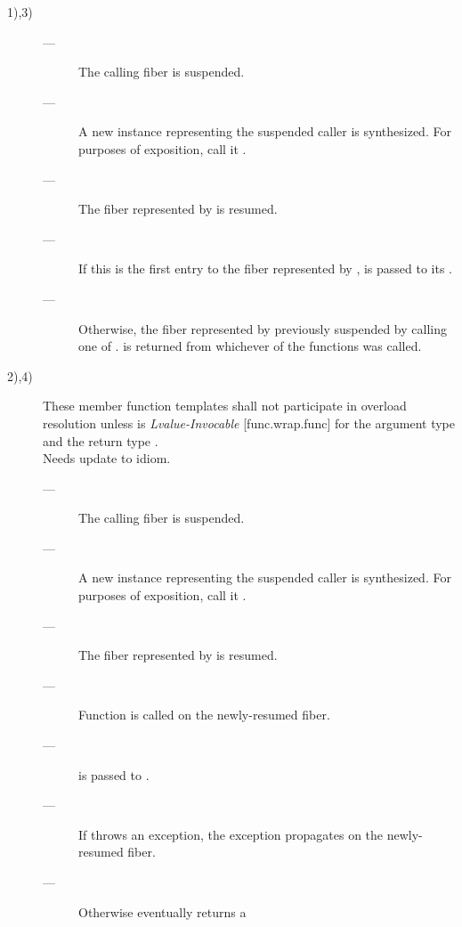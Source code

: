 \effects
\begin{description}
    \item[1),3)]
        \begin{description}
            \item[---] The calling fiber is suspended.
            \item[---] A new \fiber instance representing the suspended caller
                       is synthesized. For purposes of exposition, call
                       it .
            \item[---] The fiber represented by  is resumed.
            \item[---] If this is the first entry to the fiber represented
                       by ,  is passed to its \entryfn.
            \item[---] Otherwise, the fiber represented by 
                       previously suspended by calling one
                       of \allresume.  is returned from whichever
                       of the  functions was called.
        \end{description}
    \item[2),4)] These member function templates shall not participate in overload
              resolution unless  is \emph{Lvalue-Invocable} [func.wrap.func]
              for the argument type  and the return
              type \fiber.\\
               Needs update to  idiom.
        \begin{description}
            \item[---] The calling fiber is suspended.
            \item[---] A new \fiber instance representing the suspended caller
                       is synthesized. For purposes of exposition, call
                       it .
            \item[---] The fiber represented by  is resumed.
            \item[---] Function  is called on the newly-resumed fiber.
            \item[---]  is passed to .
            \item[---] If  throws an exception, the exception
                       propagates on the newly-resumed fiber.
            \item[---] Otherwise  eventually returns a \fiber

\end{description}
\end{description}
